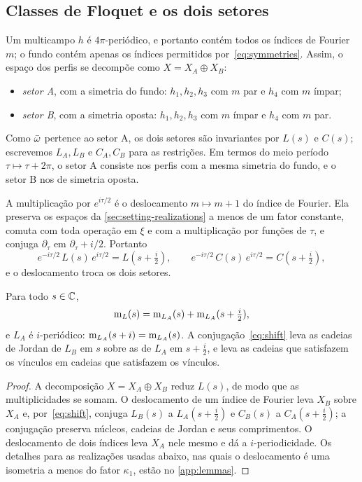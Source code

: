 \subsection{Classes de Floquet e os dois setores}\label{sec:setting-sectors}

Um multicampo $h$ é $4\pi$-periódico, e portanto contém todos os índices de Fourier $m$; o fundo contém
apenas os índices permitidos por~\eqref{eq:symmetries}. Assim, o espaço dos perfis se decompõe como
$X=X_A\oplus X_B$:
\begin{itemize}[leftmargin=*]
\item \emph{setor A}, com a simetria do fundo: $h_1,h_2,h_3$ com $m$ par e $h_4$ com
  $m$ ímpar;
\item \emph{setor B}, com a simetria oposta: $h_1,h_2,h_3$ com $m$ ímpar e $h_4$ com $m$ par.
\end{itemize}
Como $\bar\omega$ pertence ao setor A, os dois setores são invariantes por $L(s)$ e $C(s)$; escrevemos
$L_A,L_B$ e $C_A,C_B$ para as restrições. Em termos do meio período $\tau\mapsto\tau+2\pi$, o setor A
consiste nos perfis com a mesma simetria do fundo, e o setor B nos de simetria oposta.

A multiplicação por $e^{i\tau/2}$ é o deslocamento $m\mapsto m+1$ do índice de Fourier. Ela preserva os
espaços da \cref{sec:setting-realizations} a menos de um fator constante, comuta com toda operação
em $\xi$ e com a multiplicação por funções de $\tau$, e conjuga $\partial_\tau$ em
$\partial_\tau+i/2$. Portanto
\begin{equation}\label{eq:shift}
  e^{-i\tau/2}\,L(s)\,e^{i\tau/2}=L(s+\tfrac{i}{2}),\qquad
  e^{-i\tau/2}\,C(s)\,e^{i\tau/2}=C(s+\tfrac{i}{2}),
\end{equation}
e o deslocamento troca os dois setores.

\begin{lemma}\label{lem:sectorB}
Para todo $s\in\mathbb{C}$,
\[
  \operatorname{m}_L(s)=\operatorname{m}_{L_A}(s)+\operatorname{m}_{L_A}(s+\tfrac{i}{2}),
\]
e $L_A$ é $i$-periódico: $\operatorname{m}_{L_A}(s+i)=\operatorname{m}_{L_A}(s)$. A conjugação~\eqref{eq:shift} leva as
cadeias de Jordan de $L_B$ em $s$ sobre as de $L_A$ em $s+\tfrac i2$, e leva as cadeias que satisfazem os
vínculos em cadeias que satisfazem os vínculos.
\end{lemma}

\begin{proof}
A decomposição $X=X_A\oplus X_B$ reduz $L(s)$, de modo que as multiplicidades se somam. O deslocamento de um
índice de Fourier leva $X_B$ sobre $X_A$ e, por~\eqref{eq:shift}, conjuga $L_B(s)$ a $L_A(s+\tfrac i2)$ e $C_B(s)$
a $C_A(s+\tfrac i2)$; a conjugação preserva núcleos, cadeias de Jordan e seus comprimentos. O deslocamento de dois
índices leva $X_A$ nele mesmo e dá a $i$-periodicidade. Os detalhes para as realizações usadas abaixo,
nas quais o deslocamento é uma isometria a menos do fator $\kappa_1$, estão no \cref{app:lemmas}.
\end{proof}

